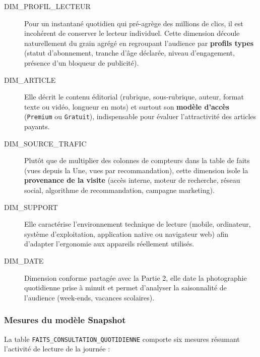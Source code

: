 \documentclass[a4paper,12pt]{article}
\begin{document}
\begin{description}
  \item[DIM\_PROFIL\_LECTEUR] Pour un instantané quotidien qui pré-agrège des millions de clics, il est incohérent de conserver le lecteur individuel. Cette dimension découle naturellement du grain agrégé en regroupant l'audience par \textbf{profils types} (statut d'abonnement, tranche d'âge déclarée, niveau d'engagement, présence d'un bloqueur de publicité).
  \item[DIM\_ARTICLE] Elle décrit le contenu éditorial (rubrique, sous-rubrique, auteur, format texte ou vidéo, longueur en mots) et surtout son \textbf{modèle d'accès} (\texttt{Premium} ou \texttt{Gratuit}), indispensable pour évaluer l'attractivité des articles payants.
  \item[DIM\_SOURCE\_TRAFIC] Plutôt que de multiplier des colonnes de compteurs dans la table de faits (vues depuis la Une, vues par recommandation), cette dimension isole la \textbf{provenance de la visite} (accès interne, moteur de recherche, réseau social, algorithme de recommandation, campagne marketing).
  \item[DIM\_SUPPORT] Elle caractérise l'environnement technique de lecture (mobile, ordinateur, système d'exploitation, application native ou navigateur web) afin d'adapter l'ergonomie aux appareils réellement utilisés.
  \item[DIM\_DATE] Dimension conforme partagée avec la Partie 2, elle date la photographie quotidienne prise à minuit et permet d'analyser la saisonnalité de l'audience (week-ends, vacances scolaires).
\end{description}

\subsubsection*{Mesures du modèle Snapshot}

La table \texttt{FAITS\_CONSULTATION\_QUOTIDIENNE} comporte six mesures résumant l'activité de lecture de la journée :
\end{document}
